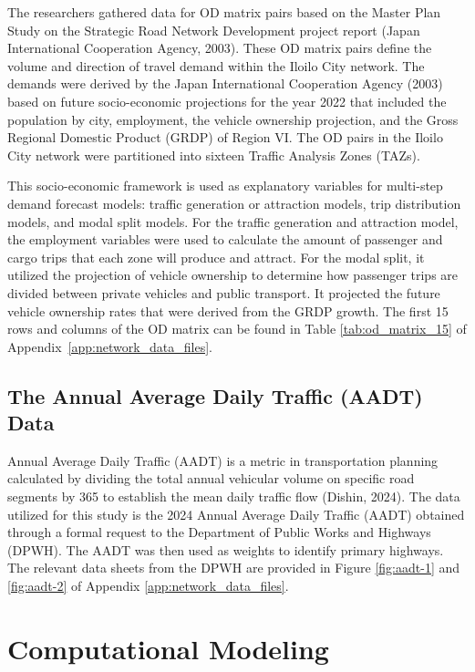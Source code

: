 The researchers gathered data for OD matrix pairs based on the Master Plan Study on the Strategic Road Network Development project report (Japan International Cooperation Agency, 2003). These OD matrix pairs define the volume and direction of travel demand within the Iloilo City network. The demands were derived by the Japan International Cooperation Agency (2003) based on future socio-economic projections for the year 2022 that included the population by city, employment, the vehicle ownership projection, and the Gross Regional Domestic Product (GRDP) of Region VI. The OD pairs in the Iloilo City network were partitioned into sixteen Traffic Analysis Zones (TAZs). 

This socio-economic framework is used as explanatory variables for multi-step demand forecast models: traffic generation or attraction models, trip distribution models, and modal split models. For the traffic generation and attraction model, the employment variables were used to calculate the amount of passenger and cargo trips that each zone will produce and attract. For the modal split, it utilized the projection of vehicle ownership to determine how passenger trips are divided between private vehicles and public transport. It projected the future vehicle ownership rates that were derived from the GRDP growth.  The  first 15 rows and columns of the OD matrix can be found in Table {\ref{tab:od_matrix_15}} of Appendix~\ref{app:network_data_files}.


\subsection{The Annual Average Daily Traffic (AADT) Data}
\label {sec:aadt}

Annual Average Daily Traffic (AADT) is a metric in transportation planning calculated by dividing the total annual vehicular volume on specific road segments by 365 to establish the mean daily traffic flow (Dishin, 2024). The data utilized for this study is the 2024 Annual Average Daily Traffic (AADT) obtained through a formal request to the Department of Public Works and Highways (DPWH). The AADT was then used as weights to identify primary highways. The relevant data sheets from the DPWH are provided in Figure \ref{fig:aadt-1} and \ref{fig:aadt-2} of Appendix \ref{app:network_data_files}.

\section{Computational Modeling}
\label{sec:computational_modeling}

